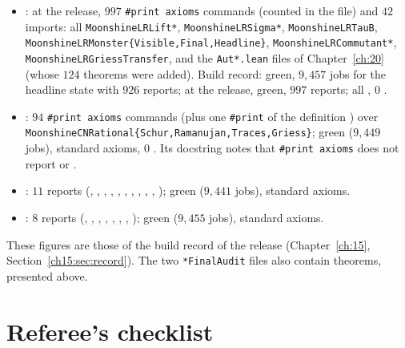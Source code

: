 \begin{itemize}
\item {}: at the release, $997$ \texttt{\#print axioms}
  commands (counted in the file) and $42$ imports: all \texttt{MoonshineLRLift*}, \texttt{MoonshineLRSigma*},
  \texttt{MoonshineLRTauB}, \texttt{MoonshineLRMonster\{Visible,Final,Headline\}}, \texttt{MoonshineLRCommutant*},
  \texttt{MoonshineLRGriessTransfer}, and the \texttt{Aut*.lean} files of
  Chapter~\ref{ch:20} (whose $124$ theorems were added).  Build record: green, $9{,}457$
  jobs for the headline state with $926$ reports; at the release, green, $997$ reports; all
  , $0$ .
\item {}: $94$ \texttt{\#print axioms} commands (plus one \texttt{\#print}
  of the definition ) over
  \texttt{MoonshineCNRational\{Schur,Ramanujan,Traces,Griess\}}; green ($9{,}449$ jobs), standard axioms, $0$ .  Its
  docstring notes that \texttt{\#print axioms} does not report  or .
\item {}: $11$ reports (,
  , , , ,
  , , , ,
  , ); green ($9{,}441$ jobs), standard axioms.
\item {}: $8$ reports (,
  , , ,
  , , , ); green
  ($9{,}455$ jobs), standard axioms.
\end{itemize}
These figures are those of the build record of the release (Chapter~\ref{ch:15}, Section~\ref{ch15:sec:record}).  The two
\texttt{*FinalAudit} files also contain theorems, presented above.

\section{Referee's checklist}\label{ch22:sec:checklist}

